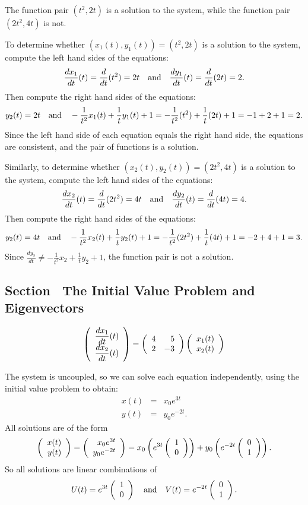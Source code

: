  \ans The function pair $(t^2,2t)$ is a solution to
the system, while the function pair $(2t^2,4t)$ is not.

\soln To determine whether $(x_1(t),y_1(t)) = (t^2,2t)$ is
a solution to the system, compute the left hand sides of the equations:
\[
\frac{dx_1}{dt}(t) = \frac{d}{dt}(t^2) = 2t \quad\mbox{and}\quad
\frac{dy_1}{dt}(t) = \frac{d}{dt}(2t) = 2.
\]
Then compute the right hand sides of the equations:
\[
y_2(t) = 2t \quad\mbox{and}\quad
-\frac{1}{t^2}x_1(t) + \frac{1}{t}y_1(t) + 1 =
-\frac{1}{t^2}(t^2) + \frac{1}{t}(2t) + 1 = -1 + 2 + 1 = 2.
\]
Since the left hand side of each equation equals the right hand side, the
equations are consistent, and the pair of functions is a solution.

\para Similarly, to determine whether $(x_2(t),y_2(t)) = (2t^2,4t)$ is a
solution to the system, compute the left hand sides of the equations:
\[
\frac{dx_2}{dt}(t) = \frac{d}{dt}(2t^2) = 4t \quad\mbox{and}\quad
\frac{dy_2}{dt}(t) = \frac{d}{dt}(4t) = 4.
\]
Then compute the right hand sides of the equations:
\[
y_2(t) = 4t \quad\mbox{and}\quad
-\frac{1}{t^2}x_2(t) + \frac{1}{t}y_2(t) + 1 =
-\frac{1}{t^2}(2t^2) + \frac{1}{t}(4t) + 1 = -2 + 4 + 1 = 3.
\]
Since $\frac{dy_2}{dt} \neq -\frac{1}{t^2}x_2 + \frac{1}{t}y_2 + 1$,
the function pair is not a solution.



\subsection*{Section~\protect{\ref{S:IVP&E}} The Initial Value Problem and
Eigenvectors}

\arraystart
\[
\left(\begin{array}{r} \displaystyle\frac{dx_1}{dt}(t) \\ 
\displaystyle\frac{dx_2}{dt}(t)\end{array}\right) =
\left(\begin{array}{rr} 4 & 5 \\ 2 & -3\end{array}\right)
\left(\begin{array}{r} x_1(t) \\ x_2(t)\end{array}\right)
\]
\arrayfinish

The system is uncoupled, so we can solve each equation
independently, using the initial value problem to obtain:
\[ \begin{array}{rcl}
x(t) & = & x_0e^{3t} \\
y(t) & = & y_0e^{-2t}. \end{array} \]
All solutions are of the form
\[ \left(\begin{array}{r} x(t) \\ y(t)\end{array}\right) = \left(\begin{array}{r} x_0e^{3t} \\ y_0e^{-2t}\end{array}\right)
= x_0\left(e^{3t}\left(\begin{array}{r} 1 \\ 0\end{array}\right)\right) +
y_0\left(e^{-2t}\left(\begin{array}{r} 0 \\ 1\end{array}\right)\right). \]
So all solutions are linear combinations of
\[ 
U(t) = e^{3t}\left(\begin{array}{r} 1 \\ 0\end{array}\right) \quad\mbox{and}\quad V(t) = e^{-2t}\left(\begin{array}{r} 0 \\ 1\end{array}\right). 
\]


